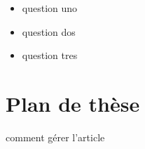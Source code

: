 \begingroup
{}
\begin{itemize}
        \setlength{\topsep}{\baselineskip}
        \setlength{\itemsep}{\baselineskip}
        \renewcommand*\labelitemi{\adfrightarrowhead}
  \item question uno
  \item question dos
  \item question tres
\end{itemize}
\endgroup

\section{Plan de thèse}
\label{sec:plan-de-these}

comment gérer l'article
